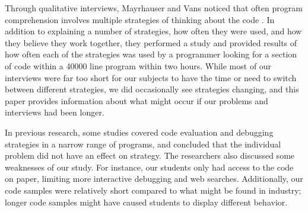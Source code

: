 Through qualitative interviews, Mayrhauser and Vans noticed that often program comprehension involves multiple strategies of thinking about the code \cite{402076}.
In addition to explaining a number of strategies, how often they were used, and how they believe they work together, they performed a study and provided results of how often each of the strategies was used by a programmer looking for a section of code within a 40000 line program within two hours.
While most of our interviews were far too short for our subjects to have the time or need to switch between different strategies, we did occasionally see strategies changing, and this paper provides information about what might occur if our problems and interviews had been longer. 

In previous research, some studies covered code evaluation and debugging strategies in a narrow range of programs, and concluded that the individual problem did not have an effect on strategy.
The researchers also discussed some weaknesses of our study. For instance, our students only had access to the code on paper, limiting more interactive debugging and web searches.
Additionally, our code samples were relatively short compared to what might be found in industry;
 longer code samples might have caused students to display different behavior.

\newpage